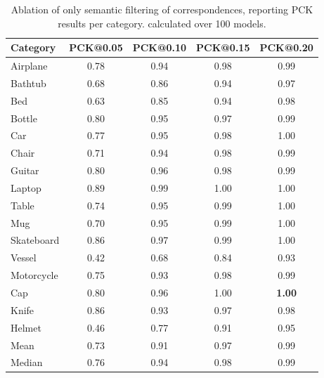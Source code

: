 \begin{table}[t]
  \centering
  \caption{Ablation of only semantic filtering of correspondences, reporting PCK results per category. calculated over 100 models.}
  \label{tab:pck_results}
  \begin{tabular}{lcccc}
    \toprule
    Category & PCK@0.05 & PCK@0.10 & PCK@0.15 & PCK@0.20 \\
    \midrule
    Airplane & 0.78 & 0.94 & 0.98 & 0.99 \\
    Bathtub & 0.68 & 0.86 & 0.94 & 0.97 \\
    Bed & 0.63 & 0.85 & 0.94 & 0.98 \\
    Bottle & 0.80 & 0.95 & 0.97 & 0.99 \\
    Car & 0.77 & 0.95 & 0.98 & 1.00 \\
    Chair & 0.71 & 0.94 & 0.98 & 0.99 \\
    Guitar & 0.80 & 0.96 & 0.98 & 0.99 \\
    Laptop & 0.89 & 0.99 & 1.00 & 1.00 \\
    Table & 0.74 & 0.95 & 0.99 & 1.00 \\
    Mug & 0.70 & 0.95 & 0.99 & 1.00 \\
    Skateboard & 0.86 & 0.97 & 0.99 & 1.00 \\
    Vessel & 0.42 & 0.68 & 0.84 & 0.93 \\
    Motorcycle & 0.75 & 0.93 & 0.98 & 0.99 \\
    Cap & 0.80 & 0.96 & 1.00 & \textbf{1.00} \\
    Knife & 0.86 & 0.93 & 0.97 & 0.98 \\
    Helmet & 0.46 & 0.77 & 0.91 & 0.95 \\
    \midrule
     Mean & 0.73 & 0.91 & 0.97 & 0.99 \\
    Median & 0.76 & 0.94 & 0.98 & 0.99 \\
    \bottomrule
  \end{tabular}
\end{table}